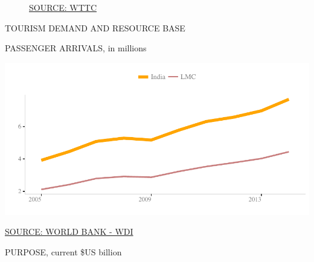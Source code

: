 \documentclass{article}\usepackage[]{graphicx}\usepackage[]{color}
\makeatletter
\def\maxwidth{ %
  \ifdim\Gin@nat@width>\linewidth
    \linewidth
  \else
    \Gin@nat@width
  \fi
}
\makeatother
\begin{document}
\begin{figure}
\begin{minipage}[t]{0.99\textwidth}
\begin{minipage}[t]{0.56\textwidth}
\begin{minipage}[c]{0.30\textwidth}
{}



    \vspace{-2ex}
    \hspace{2ex}\tiny{\href{https://tool.wttc.org/}{\textcolor[HTML]{FF4023}{SOURCE: WTTC}}}
    \end{minipage}
  \end{minipage}
\end{minipage}
\end{figure}

\begin{minipage}[t]{0.95\textwidth}
  \begin{flushleft}  
    \hspace{4ex}\Large{\textcolor[HTML]{FF4023}{TOURISM DEMAND AND RESOURCE BASE}}\hspace{2ex}\small{\textcolor[HTML]{818181}{}}
  \end{flushleft}
  \begin{minipage}[b]{0.5\textwidth}
      \hspace{4ex}\small{\textcolor[HTML]{818181}{PASSENGER ARRIVALS, in millions}}
      \vspace{1ex}


\hfill{}\includegraphics[width=\maxwidth]{figure/line1_1-1} 



     \hspace{4ex}\scriptsize{\href{NA}{\textcolor[HTML]{FF4023}{SOURCE: WORLD BANK - WDI}}}
  \end{minipage}
  \begin{minipage}[b]{0.5\textwidth}  
      \hspace{4ex}\small{\textcolor[HTML]{818181}{PURPOSE, current \$US billion}}
      \vspace{1ex}



\end{minipage}
\end{minipage}
\end{document}
